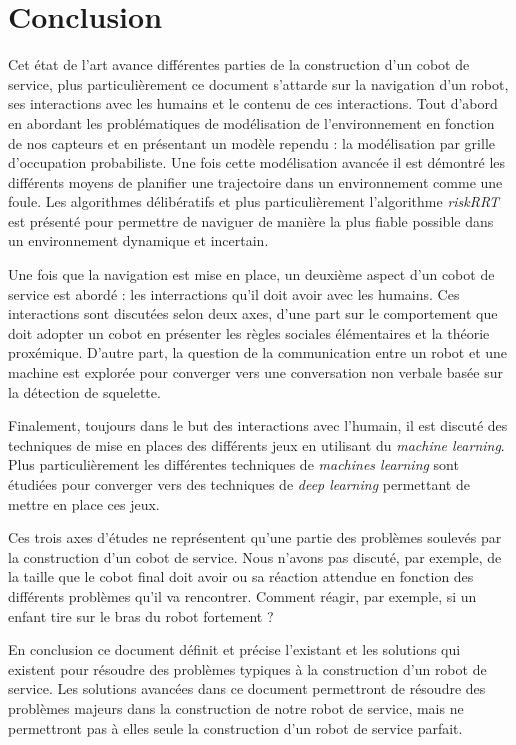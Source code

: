 
\section*{Conclusion}
 \label{sec:conclusion}

Cet état de l'art avance différentes parties de la construction d'un cobot de service, plus particulièrement ce document s'attarde sur la navigation d'un robot, ses interactions avec les humains et le contenu de ces interactions. Tout d'abord en abordant les problématiques de modélisation de l'environnement en fonction de nos capteurs et en présentant un modèle rependu : la modélisation par grille d'occupation probabiliste. Une fois cette modélisation avancée il est démontré les différents moyens de planifier une trajectoire dans un environnement comme une foule. Les algorithmes délibératifs et plus particulièrement l'algorithme \textit{riskRRT} est présenté pour permettre de naviguer de manière la plus fiable possible dans un environnement dynamique et incertain.

Une fois que la navigation est mise en place, un deuxième aspect d'un cobot de service est abordé : les interractions qu'il doit avoir avec les humains. Ces interactions sont discutées selon deux axes, d'une part sur le comportement que doit adopter un cobot en présenter les règles sociales élémentaires et la théorie proxémique. D'autre part, la question de la communication entre un robot et une machine est explorée pour converger vers une conversation non verbale basée sur la détection de squelette. 

Finalement, toujours dans le but des interactions avec l'humain, il est discuté des techniques de mise en places des différents jeux en utilisant du \textit{machine learning}. Plus particulièrement les différentes techniques de \textit{machines learning} sont étudiées pour converger vers des techniques de \textit{deep learning} permettant de mettre en place ces jeux.

Ces trois axes d'études ne représentent qu'une partie des problèmes soulevés par la construction d'un cobot de service. Nous n'avons pas discuté, par exemple, de la taille que le cobot final doit avoir ou sa réaction attendue en fonction des différents problèmes qu'il va rencontrer. Comment réagir, par exemple, si un enfant tire sur le bras du robot fortement ?

En conclusion ce document définit et précise l'existant et les solutions qui existent pour résoudre des problèmes typiques à la construction d'un robot de service. Les solutions avancées dans ce document permettront de résoudre des problèmes majeurs dans la construction de notre robot de service, mais ne permettront pas à elles seule la construction d'un robot de service parfait.

